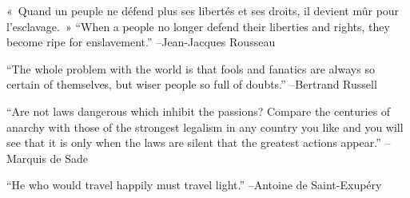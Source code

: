 \documentclass{article}%
\begin{document}
\linebreak%
\vspace{1mm}%
\begin{minipage}{\textwidth}%
\flushleft%
«~Quand un peuple ne défend plus ses libertés et ses droits, il devient mûr pour l'esclavage.~»%
\linebreak%
\vspace{1mm}%
“When a people no longer defend their liberties and rights, they become ripe for enslavement.”%
\linebreak%
–Jean{-}Jacques Rousseau%
\linebreak%
\vspace{1mm}%
\end{minipage}%
\linebreak%
\vspace{1mm}%
\begin{minipage}{\textwidth}%
\flushleft%
“The whole problem with the world is that fools and fanatics are always so certain of themselves, but wiser people so full of doubts.”%
\linebreak%
\vspace{1mm}%
–Bertrand Russell%
\linebreak%
\vspace{1mm}%
\end{minipage}%
\linebreak%
\vspace{1mm}%
\begin{minipage}{\textwidth}%
\flushleft%
“Are not laws dangerous which inhibit the passions? Compare the centuries of anarchy with those of the strongest legalism in any country you like and you will see that it is only when the laws are silent that the greatest actions appear.”%
\linebreak%
\vspace{1mm}%
–Marquis de Sade%
\linebreak%
\vspace{1mm}%
\end{minipage}%
\linebreak%
\vspace{1mm}%
\begin{minipage}{\textwidth}%
\flushleft%
“He who would travel happily must travel light.”%
\linebreak%
\vspace{1mm}%
–Antoine de Saint{-}Exupéry%
\linebreak%
\vspace{1mm}%
\end{minipage}%
\linebreak%
\end{document}
